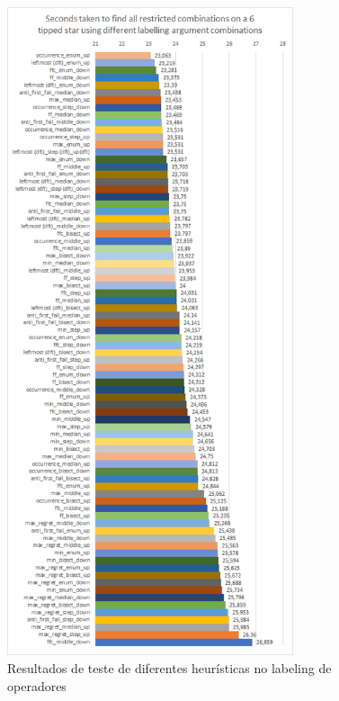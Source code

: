 \begin{figure}[ht]
\centering
\includegraphics[width=0.75\textwidth]{figuras/graphs/ops_heuristics_analysis.png}
\caption{Resultados de teste de diferentes heurísticas no labeling de operadores}
\label{gph:ops_heuristics_analysis}
\end{figure}